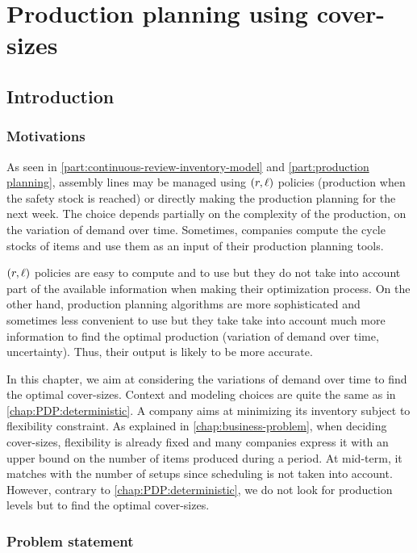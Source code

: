 \chapter{Production planning using cover-sizes}


\section{Introduction}


\subsection{Motivations}


As seen in \cref{part:continuous-review-inventory-model} and \cref{part:production planning}, assembly lines may be managed using $\bracket{r,\ell}$ policies (\ie production when the safety stock is reached) or directly making the production planning for the next week.
The choice depends partially on the complexity of the production, on the variation of demand over time.
Sometimes, companies compute the cycle stocks of items and use them as an input of their production planning tools.


$\bracket{r,\ell}$ policies are easy to compute and to use but they do not take into account part of the available information when making their optimization process.
On the other hand, production planning algorithms are more sophisticated and sometimes less convenient to use but they take take into account much more information to find the optimal production (variation of demand over time, uncertainty).
Thus, their output is likely to be more accurate.


In this chapter, we aim at considering the variations of demand over time to find the optimal cover-sizes.
Context and modeling choices are quite the same as in \cref{chap:PDP:deterministic}.
A company aims at minimizing its inventory subject to flexibility constraint.
As explained in \cref{chap:business-problem}, when deciding cover-sizes, flexibility is already fixed and many companies express it with an upper bound on the number of items produced during a period.
At mid-term, it matches with the number of setups since scheduling is not taken into account.
However, contrary to \cref{chap:PDP:deterministic}, we do not look for production levels but to find the optimal cover-sizes.



\subsection{Problem statement}


